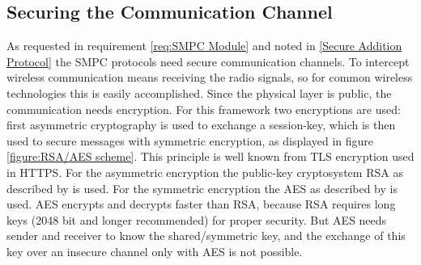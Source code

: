 \subsection{Securing the Communication Channel} \label{Securing the Communication Channel}

As requested in requirement \ref{req:SMPC Module} and noted in \ref{Secure Addition Protocol} the \gls{SMPC} protocols need secure communication channels. To intercept wireless communication means receiving the radio signals, so for common wireless technologies this is easily accomplished. Since the physical layer is public, the communication needs encryption. 
For this framework two encryptions are used: first asymmetric cryptography is used to exchange a session-key, which is then used to secure messages with symmetric encryption, as displayed in figure \ref{figure:RSA/AES scheme}. This principle is well known from \gls{TLS} encryption used in \gls{HTTPS}. For the asymmetric encryption the public-key cryptosystem \acs{RSA} as described by \textcite[pp. 49-76]{Delfs2015} is used. For the symmetric encryption the \gls{AES} as described by \textcite[pp. 19-25]{Delfs2015} is used.
\gls{AES} encrypts and decrypts faster than \gls{RSA}, because \gls{RSA} requires long keys (2048 bit and longer recommended) for proper security. But \gls{AES} needs sender and receiver to know the shared/symmetric key, and the exchange of this key over an insecure channel only with \gls{AES} is not possible.

